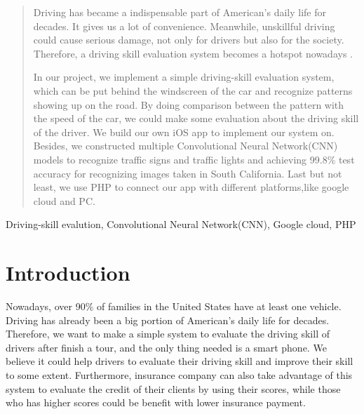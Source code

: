\documentclass[conference]{IEEEtran}
\begin{document}
\begin{abstract}
Driving has became a indispensable part of American's daily life for decades. It gives us a lot of convenience. Meanwhile, unskillful driving could cause serious damage, not only for drivers but also for the society. Therefore, a driving skill evaluation system becomes a hotspot nowadays . 

In our project, we implement a simple driving-skill evaluation system, which can be put behind the windscreen of the car and recognize patterns showing up on the road. By doing comparison between the pattern with the speed of the car, we could make some evaluation about the driving skill of the driver. We build our own iOS app to implement our system on. Besides, we constructed multiple Convolutional Neural Network(CNN) models to recognize traffic signs and traffic lights and achieving 99.8\% test accuracy for recognizing images taken in South California. Last but not least, we use PHP to connect our app with different platforms,like google cloud and PC.
\end{abstract}

\begin{IEEEkeywords}
Driving-skill evalution, Convolutional Neural Network(CNN),  Google cloud, PHP
\end{IEEEkeywords}

\section{Introduction}
Nowadays, over 90\% of families in the United States have at least one vehicle. Driving has already been a big portion of American's daily life for decades. Therefore, we want to make a simple system to evaluate the driving skill of drivers after finish a tour, and the only thing needed is a smart phone. We believe it could help drivers to evaluate their driving skill and improve their skill to some extent. Furthermore, insurance company can also take advantage of this system to evaluate the credit of their clients by using their scores, while those who has higher scores could be benefit with lower insurance payment.
\end{document}
